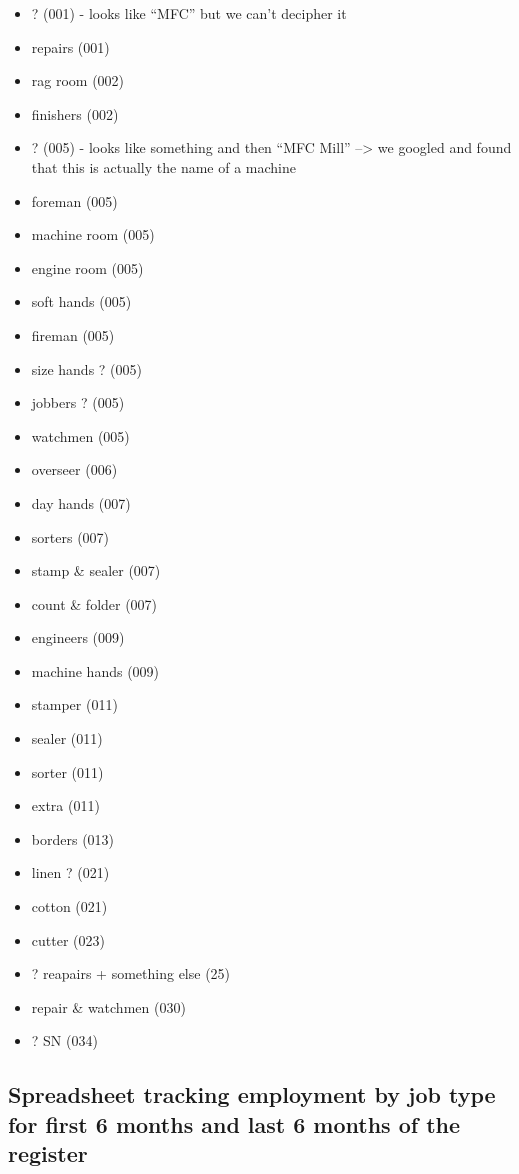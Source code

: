 \documentclass[
  letterpaper,
  DIV=11,
  numbers=noendperiod]{scrartcl}
\begin{document}
\begin{itemize}
\item
  ? (001) - looks like ``MFC'' but we can't decipher it
\item
  repairs (001)
\item
  rag room (002)
\item
  finishers (002)
\item
  ? (005) - looks like something and then ``MFC Mill'' --\textgreater{}
  we googled and found that this is actually the name of a machine
\item
  foreman (005)
\item
  machine room (005)
\item
  engine room (005)
\item
  soft hands (005)
\item
  fireman (005)
\item
  size hands ? (005)
\item
  jobbers ? (005)
\item
  watchmen (005)
\item
  overseer (006)
\item
  day hands (007)
\item
  sorters (007)
\item
  stamp \& sealer (007)
\item
  count \& folder (007)
\item
  engineers (009)
\item
  machine hands (009)
\item
  stamper (011)
\item
  sealer (011)
\item
  sorter (011)
\item
  extra (011)
\item
  borders (013)
\item
  linen ? (021)
\item
  cotton (021)
\item
  cutter (023)
\item
  ? reapairs + something else (25)
\item
  repair \& watchmen (030)
\item
  ? SN (034)
\end{itemize}

\hypertarget{spreadsheet-tracking-employment-by-job-type-for-first-6-months-and-last-6-months-of-the-register}{%
\subsection{Spreadsheet tracking employment by job type for first 6
months and last 6 months of the
register}\label{spreadsheet-tracking-employment-by-job-type-for-first-6-months-and-last-6-months-of-the-register}}
\end{document}
